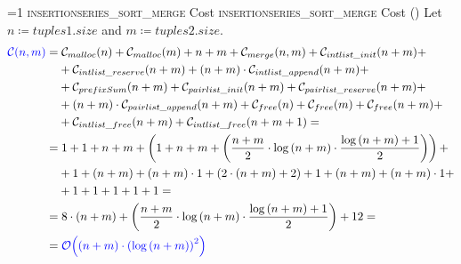 \setcounter{insertionseriessortmergecostcounter}{1}
\newcommand{\insertionseriessortmergecostframe}{%
    \ifnum\value{insertionseriessortmergecostcounter}=1
        \textsc{insertionseries\_sort\_merge} Cost%
    \else
        \textsc{insertionseries\_sort\_merge} Cost (\theinsertionseriessortmergecostcounter)%
    \fi
}
        \begin{frame}{\insertionseriessortmergecostframe}
            \scriptsize
            Let $n \coloneqq tuples1.size$ and $m \coloneqq tuples2.size$.
            \begin{align*}
                \textcolor{blue}{\mathcal{C}{\left(n, m\right)}} = & \; \mathcal{C}_{malloc}{\left(n\right)} + \mathcal{C}_{malloc}{\left(m\right)} + n + m + \mathcal{C}_{merge}{\left(n, m\right)} + \mathcal{C}_{intlist\_init}{\left(n + m\right)} + \\
                & + \mathcal{C}_{intlist\_reserve}{\left(n + m\right)} +\left(n + m\right) \cdot \mathcal{C}_{intlist\_append}{\left(n + m\right)} + \\
                & + \mathcal{C}_{prefixSum}{\left(n + m\right)} + \mathcal{C}_{pairlist\_init}{\left(n + m\right)} + \mathcal{C}_{pairlist\_reserve}{\left(n + m\right)} + \\
                & + \left(n + m\right) \cdot \mathcal{C}_{pairlist\_append}{\left(n + m\right)} + \mathcal{C}_{free}{\left(n\right)} + \mathcal{C}_{free}{\left(m\right)} + \mathcal{C}_{free}{\left(n + m\right)} + \\
                & + \mathcal{C}_{intlist\_free}{\left(n + m\right)} + \mathcal{C}_{intlist\_free}{\left(n + m + 1\right)} = 
                \\
                = & \; 1 + 1 + n + m + \left(1 + n + m + \left(\frac{n + m}{2} \cdot \log{\left(n + m\right)} \cdot \frac{\log{\left(n + m\right)} + 1}{2}\right)\right) + \\
                & + 1 + \left(n + m\right) + \left(n + m\right) \cdot 1 + \left(2 \cdot \left(n + m\right) + 2\right) + 1 + \left(n + m\right) + \left(n + m\right) \cdot 1 + \\
                & + 1 + 1 + 1 + 1 + 1 = \\
                = & \; 8 \cdot \left(n + m\right) + \left(\frac{n + m}{2} \cdot \log{\left(n + m\right)} \cdot \frac{\log{\left(n + m\right)} + 1}{2}\right) + 12 = \\
                = & \; \textcolor{blue}{\mathcal{O}{\left(\left(n + m\right) \cdot \left(\log{\left(n + m\right)}\right)^2\right)}}
            \end{align*}
        \end{frame}

